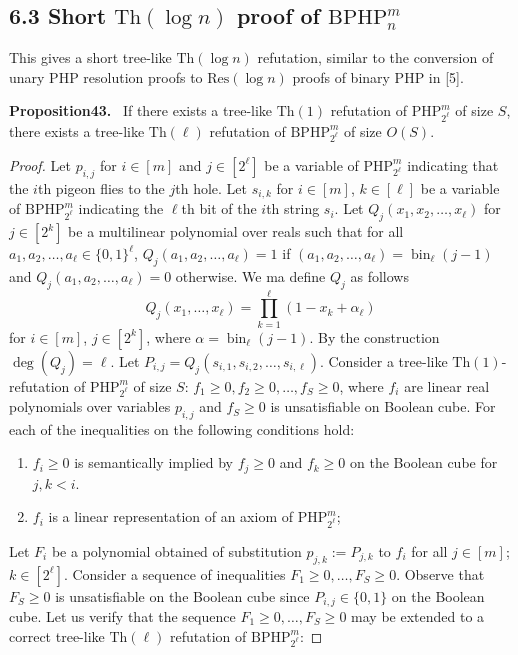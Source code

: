 \documentclass[10pt,a4paper]{article}
\newenvironment{authorclaim}[1]{\par\medskip\noindent\textbf{#1.}\ \ignorespaces}{\par\medskip}
\begin{document}
\subsection*{6.3 Short $\mathrm{Th}(\log n)$ proof of $\mathrm{BPHP}_n^m$}
This gives a short tree-like $\mathrm{Th}(\log n)$ refutation, similar to the conversion of unary PHP resolution proofs to $\mathrm{Res}(\log n)$ proofs of binary PHP in [5].
\begin{authorclaim}{Proposition43}
If there exists a tree-like $\mathrm{Th}(1)$ refutation of $\mathrm{PHP}_{2^\ell}^m$ of size $S$, there exists a tree-like $\mathrm{Th}(\ell)$ refutation of $\mathrm{BPHP}_{2^\ell}^m$ of size $O(S)$.
\end{authorclaim}
\begin{proof}
Let $p_{i,j}$ for $i\in[m]$ and $j\in[2^\ell]$ be a variable of $\mathrm{PHP}_{2^\ell}^m$ indicating that the $i$th pigeon flies to the $j$th hole. Let $s_{i,k}$ for $i\in[m]$, $k\in[\ell]$ be a variable of $\mathrm{BPHP}_{2^\ell}^m$ indicating the $\ell$th bit of the $i$th string $s_i$.
Let $Q_j(x_1,x_2,\ldots,x_\ell)$ for $j\in[2^k]$ be a multilinear polynomial over reals such that for all $a_1,a_2,\ldots,a_\ell\in\{0,1\}^\ell$, $Q_j(a_1,a_2,\ldots,a_\ell)=1$ if $(a_1,a_2,\ldots,a_\ell)=\operatorname{bin}_\ell(j-1)$ and $Q_j(a_1,a_2,\ldots,a_\ell)=0$ otherwise. We ma define $Q_j$ as follows
\[
Q_j(x_1,\ldots,x_\ell)=\prod_{k=1}^{\ell}(1-x_k+\alpha_\ell)
\]
for $i\in[m]$, $j\in[2^k]$, where $\alpha=\operatorname{bin}_\ell(j-1)$. By the construction $\deg(Q_j)=\ell$.
Let $P_{i,j}=Q_j(s_{i,1},s_{i,2},\ldots,s_{i,\ell})$.
Consider a tree-like $\mathrm{Th}(1)$-refutation of $\mathrm{PHP}_{2^\ell}^m$ of size $S$: $f_1\ge0,f_2\ge0,\ldots,f_S\ge0$, where $f_i$ are linear real polynomials over variables $p_{i,j}$ and $f_S\ge0$ is unsatisfiable on Boolean cube. For each of the inequalities on the following conditions hold:
\begin{enumerate}
\item[(a)] $f_i\ge0$ is semantically implied by $f_j\ge0$ and $f_k\ge0$ on the Boolean cube for $j,k<i$.
\item[(b)] $f_i$ is a linear representation of an axiom of $\mathrm{PHP}_{2^\ell}^m$;
\end{enumerate}
Let $F_i$ be a polynomial obtained of substitution $p_{j,k}:=P_{j,k}$ to $f_i$ for all $j\in[m]$; $k\in[2^\ell]$.
Consider a sequence of inequalities $F_1\ge0,\ldots,F_S\ge0$. Observe that $F_S\ge0$ is unsatisfiable on the Boolean cube since $P_{i,j}\in\{0,1\}$ on the Boolean cube. Let us verify that the sequence $F_1\ge0,\ldots,F_S\ge0$ may be extended to a correct tree-like $\mathrm{Th}(\ell)$ refutation of $\mathrm{BPHP}_{2^\ell}^m$:

\end{proof}
\end{document}
